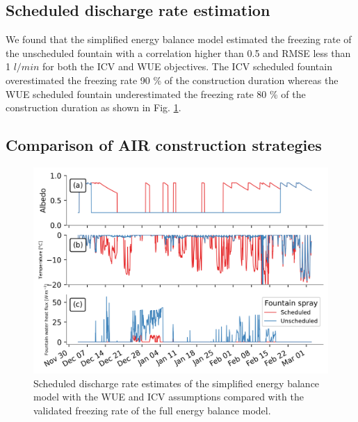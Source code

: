 \documentclass[tc, manuscript]{copernicus}
\begin{document}
\subsection{Scheduled discharge rate estimation}

We found that the simplified energy balance model estimated the freezing rate of the unscheduled fountain with a correlation higher than 0.5 and RMSE less than 1 $l/min$ for both the ICV and WUE objectives. The ICV scheduled fountain overestimated the freezing rate 90 \% of the construction duration whereas the WUE
scheduled fountain underestimated the freezing rate 80 \% of the construction duration as shown in Fig.
\ref{fig:freezing_rate}.


\subsection{Comparison of AIR construction strategies}

\begin{figure}[t]
\includegraphics[width=12cm]{Figures/dis_processes.png}
\caption{Scheduled discharge rate estimates of the simplified energy balance model with the WUE and ICV
assumptions compared with the validated freezing rate of the full energy balance model.}
\label{fig:freezing_rate}
\end{figure}
\end{document}

